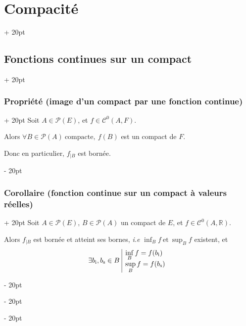 \documentclass[a4paper, 12pt, twoside]{article}
\newcommand{\R}{\mathbb{R}} %
\newcommand{\lr}[1]{\left( #1 \right)}
\newcommand{\ind}[1][20pt]{\advance\leftskip + #1}
\newcommand{\deind}[1][20pt]{\advance\leftskip - #1}
\newenvironment{indt}[2][20pt]{#2 \par \ind[#1]}{\par \deind} %
\begin{document}
\begin{indt}{\section{Compacité}}
        \vspace{12pt}
        
        \begin{indt}{\subsection{Fonctions continues sur un compact}}
            \begin{indt}{\subsubsection{Propriété (image d'un compact par une fonction continue)}}
                Soit $A \in \mathcal P(E)$, et $f \in \mathcal C^0(A, F)$.

                \vspace{6pt}
                
                Alors $\forall B \in \mathcal P(A)\ \text{compacte},\ f(B)$ est un compact de $F$.

                \vspace{6pt}
                
                Donc en particulier, $f_{|B}$ est bornée.
            \end{indt}

            \vspace{12pt}
            
            \begin{indt}{\subsubsection{Corollaire (fonction continue sur un compact à valeurs réelles)}}
                Soit $A \in \mathcal P(E)$, $B \in \mathcal P(A)$ un compact de $E$, et $f \in \mathcal C^0(A, \R)$.

                \vspace{6pt}
                
                Alors $f_{|B}$ est bornée et atteint ses bornes, \textit{i.e} $\displaystyle \inf_B f\ \text{et}\ \sup_B f$ existent, et
                \[
                    \exists b_{\rm i}, b_{\rm s} \in B\
                    \begin{array}{|l}
                        \displaystyle
                        \inf_B f = f\!\lr{b_{\rm i}}
                        \\
                        \displaystyle
                        \sup_B f = f\!\lr{b_{\rm s}}
                    \end{array}
                \]
            \end{indt}


\end{indt}
\end{indt}
\end{document}
